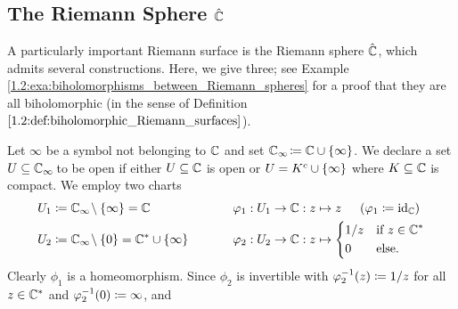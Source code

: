 \documentclass[../Moduli_Spaces_of_Riemann_Surfaces.tex]{subfiles}
\begin{document}
    \subsection{The Riemann Sphere $\hat{\mathbb{C}}$}
    A particularly important Riemann surface is the Riemann sphere $\hat{\mathbb{C}}$, which admits several constructions. Here, we give three; see Example \ref{1.2:exa:biholomorphisms_between_Riemann_spheres} for a proof that they are all biholomorphic (in the sense of Definition $\ref{1.2:def:biholomorphic_Riemann_surfaces}$).
    \begin{example}\label{1.1:exa:one_point_compactification_of_C}
        Let $\infty$ be a symbol not belonging to $\mathbb{C}$ and set $\mathbb{C}_\infty\!\coloneqq\mathbb{C}\cup\left\{\infty\right\}$. We declare a set $U\subseteq\mathbb{C}_\infty\!$ to be open if either $U\subseteq\mathbb{C}$ is open or $U=K^c\cup\left\{\infty\right\}$ where $K\subseteq\mathbb{C}$ is compact. We employ two charts
        \begin{equation*}
            \begin{alignedat}{2}
                U_1&\coloneqq\C_\infty\!\comp\l\{\infty\r\}=\C\ \ \ \ \ \ \ \ \ \ \ \ \ \ \ \ \ \ \ \ &&\phi_1:U_1\to\C:z\mapsto z\ \ \ \ \l(\phi_1\coloneqq\id_\C\r) \\
                U_2&\coloneqq\C_\infty\!\comp\l\{0\r\}=\C^\ast\cup\l\{\infty\r\}&&\phi_2:U_2\to\C:z\mapsto
                \begin{dcases}
                    1/z & \textrm{if }z\in\C^\ast \\
                    0 & \textrm{else.}
                \end{dcases}
            \end{alignedat}
        \end{equation*}
        Clearly $\phi_1$ is a homeomorphism. Since $\phi_2$ is invertible with $\varphi_2^{-1}\!\left(z\right)\coloneqq1/z$ for all $z\in\mathbb{C}^\ast$ and $\varphi_2^{-1}\!\left(0\right)\coloneqq\infty$, and

\end{example}
\end{document}

